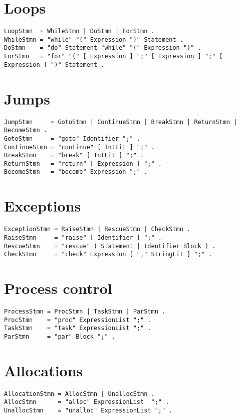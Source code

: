 \hypertarget{loops}{%
\section{Loops}\label{loops}}

\begin{lstlisting}
LoopStmn  = WhileStmn | DoStmn | ForStmn .
WhileStmn = "while" "(" Expression ")" Statement .
DoStmn    = "do" Statement "while" "(" Expression ")" .
ForStmn   = "for" "(" [ Expression ] ";" [ Expression ] ";" [ Expression ] ")" Statement .
\end{lstlisting}

\hypertarget{jumps}{%
\section{Jumps}\label{jumps}}

\begin{lstlisting}
JumpStmn     = GotoStmn | ContinueStmn | BreakStmn | ReturnStmn | BecomeStmn .
GotoStmn     = "goto" Identifier ";" .
ContinueStmn = "continue" [ IntLit ] ";" .
BreakStmn    = "break" [ IntLit ] ";" .
ReturnStmn   = "return" [ Expression ] ";" .
BecomeStmn   = "become" Expression ";" .
\end{lstlisting}

\hypertarget{exceptions}{%
\section{Exceptions}\label{exceptions}}

\begin{lstlisting}
ExceptionStmn = RaiseStmn | RescueStmn | CheckStmn .
RaiseStmn     = "raise" [ Identifier ] ";" .
RescueStmn    = "rescue" ( Statement | Identifier Block ) .
CheckStmn     = "check" Expression [ "," StringLit ] ";" .
\end{lstlisting}

\hypertarget{process-control}{%
\section{Process control}\label{process-control}}

\begin{lstlisting}
ProcessStmn = ProcStmn | TaskStmn | ParStmn .
ProcStmn    = "proc" ExpressionList ";" .
TaskStmn    = "task" ExpressionList ";" .
ParStmn     = "par" Block ";" .
\end{lstlisting}

\hypertarget{allocations}{%
\section{Allocations}\label{allocations}}

\begin{lstlisting}
AllocationStmn = AllocStmn | UnallocStmn .
AllocStmn      = "alloc" ExpressionList  ";" .
UnallocStmn    = "unalloc" ExpressionList ";" .
\end{lstlisting}

